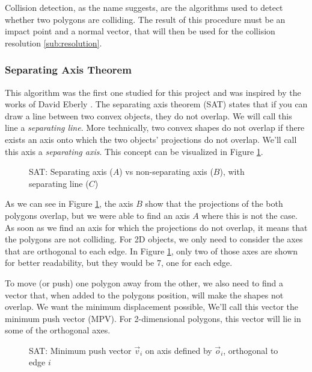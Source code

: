 Collision detection, as the name suggests, are the algorithms used to detect
whether two polygons are colliding. The result of this procedure must be an
impact point and a normal vector, that will then be used for the  collision
resolution \ref{sub:resolution}.

\subsubsection{Separating Axis Theorem}

This algorithm was the first one studied for this project and was inspired by
the works of David Eberly \cite{convexcollisionsSAT}. The separating axis
theorem (SAT) states that if you can draw a line between two convex objects,
they do not overlap. We will call this line a \textit{separating line}. More
technically, two convex shapes do not overlap if there exists an axis onto which
the two objects' projections do not overlap. We'll call this axis a \textit{separating
	axis}. This concept can be visualized in Figure \ref{fig:SAT-intro}.

\begin{figure}[H]
	\centering
	\caption{SAT: Separating axis ($A$) vs non-separating axis ($B$), with
		separating line ($C$)}
	\label{fig:SAT-intro}
\end{figure}

As we can see in Figure \ref{fig:SAT-intro}, the axis $B$ show that the
projections of the both polygons overlap, but we were able to find an axis $A$
where this is not the case. As soon as we find an axis for which the projections
do not overlap, it means that the polygons are not colliding. For 2D objects, we
only need to consider the axes that are orthogonal to each edge. In Figure
\ref{fig:SAT-intro}, only two of those axes are shown for better readability,
but they would be 7, one for each edge.

To move (or push) one polygon away from the other, we also need to find a vector
that, when added to the polygons position, will make the shapes not overlap. We
want the minimum displacement possible, We'll call this vector the minimum push
vector (MPV). For 2-dimensional polygons, this vector will lie in some of the
orthogonal axes.

\begin{figure}[H]
	\centering
	\caption{SAT: Minimum push vector $\vec v_i$ on axis defined by $\vec o_i$,
		orthogonal to edge $i$}
	\label{fig:SAT-mpv}
\end{figure}

